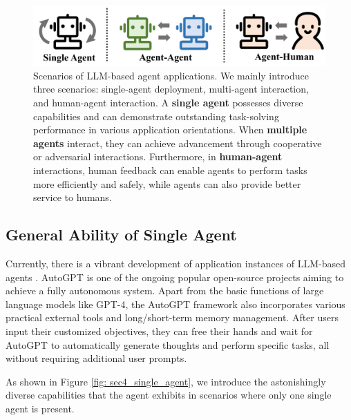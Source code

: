 \begin{figure}[t]
    \centering
    \includegraphics[width=0.85 \textwidth]{figures/sec4_frame.pdf}
    \caption{Scenarios of LLM-based agent applications. We mainly introduce three scenarios: single-agent deployment, multi-agent interaction, and human-agent interaction. A \textbf{single agent} possesses diverse capabilities and can demonstrate outstanding task-solving performance in various application orientations. When \textbf{multiple agents} interact, they can achieve advancement through cooperative or adversarial interactions. Furthermore, in \textbf{human-agent} interactions, human feedback can enable agents to perform tasks more efficiently and safely, while agents can also provide better service to humans.}
    \label{fig: sec4_framework}
\end{figure} 
\subsection{General Ability of Single Agent}\label{sec:General Ability of Single Agent}
Currently, there is a vibrant development of application instances of LLM-based agents \cite{Chase-LangChain-2022, AgentGPT, gptengineer}. AutoGPT \cite{gravitasauto} is one of the ongoing popular open-source projects aiming to achieve a fully autonomous system. Apart from the basic functions of large language models like GPT-4, the AutoGPT framework also incorporates various practical external tools and long/short-term memory management. After users input their customized objectives, they can free their hands and wait for AutoGPT to automatically generate thoughts and perform specific tasks, all without requiring additional user prompts.



As shown in Figure \ref{fig: sec4_single_agent}, we introduce the astonishingly diverse capabilities that the agent exhibits in scenarios where only one single agent is present.

